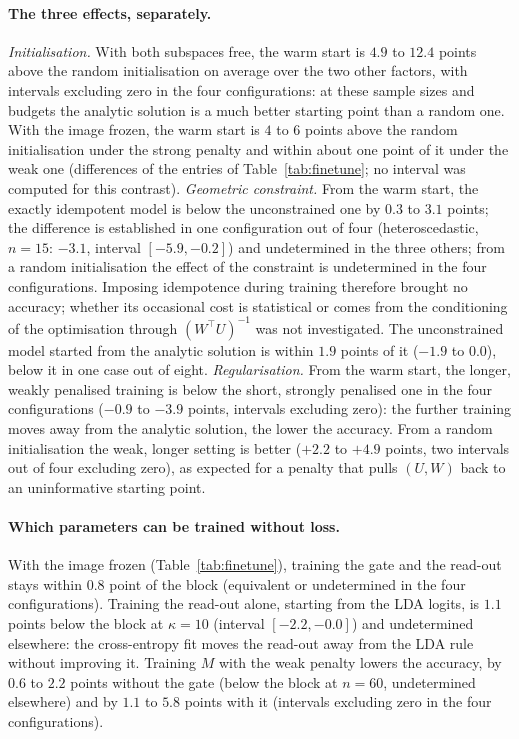 \documentclass[11pt,a4paper]{article}
\theoremstyle{plain}
\theoremstyle{definition}
\theoremstyle{remark}
\newcommand{\T}{\top}
\begin{document}
\paragraph{The three effects, separately.}
\emph{Initialisation.} With both subspaces free, the warm start is $4.9$
to $12.4$ points above the random initialisation on average over the two
other factors, with intervals excluding zero in the four configurations:
at these sample sizes and budgets the analytic solution is a much better
starting point than a random one. With the image frozen, the warm start
is $4$ to $6$ points above the random initialisation under the strong
penalty and within about one point of it under the weak one (differences of
the entries of Table~\ref{tab:finetune}; no interval was computed for this
contrast).
\emph{Geometric constraint.} From the warm start, the exactly idempotent
model is below the unconstrained one by $0.3$ to $3.1$ points; the
difference is established in one configuration out of four
(heteroscedastic, $n=15$: $-3.1$, interval $[-5.9,-0.2]$) and undetermined
in the three others; from a random initialisation the effect of the
constraint is undetermined in the four configurations. Imposing
idempotence during training therefore brought no accuracy; whether its
occasional cost is statistical or comes from the conditioning of the
optimisation through $(W^\T U)^{-1}$ was not investigated. The
unconstrained model started from the analytic solution is within $1.9$
points of it ($-1.9$ to $0.0$), below it in one case out of eight.
\emph{Regularisation.} From the warm start, the longer, weakly penalised
training is below the short, strongly penalised one in the four
configurations ($-0.9$ to $-3.9$ points, intervals excluding zero): the
further training moves away from the analytic solution, the lower the
accuracy. From a random initialisation the weak, longer setting is better
($+2.2$ to $+4.9$ points, two intervals out of four excluding zero), as
expected for a penalty that pulls $(U,W)$ back to an uninformative
starting point.

\paragraph{Which parameters can be trained without loss.} With the image
frozen (Table~\ref{tab:finetune}), training the gate and the read-out stays
within $0.8$ point of the block (equivalent or undetermined in the four
configurations). Training the read-out alone, starting from the LDA logits,
is $1.1$ points below the block at $\kappa=10$ (interval $[-2.2,-0.0]$) and
undetermined elsewhere: the cross-entropy fit moves the read-out away from
the LDA rule without improving it. Training $M$ with the weak penalty lowers
the accuracy, by $0.6$ to $2.2$ points without the gate (below the block at
$n=60$, undetermined elsewhere) and by $1.1$ to $5.8$ points with it
(intervals excluding zero in the four configurations).
\end{document}
